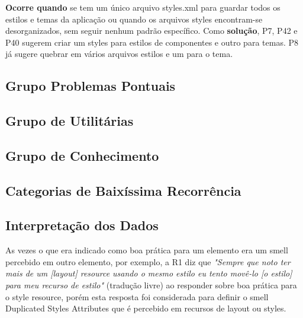 \textbf{Ocorre quando} se tem um \'unico arquivo styles.xml para guardar todos os estilos e temas da aplica\c{c}\~ao ou quando os arquivos styles encontram-se desorganizados, sem seguir nenhum padr\~ao espec\'ifico. Como \textbf{solu\c{c}\~ao}, P7, P42 e P40 sugerem criar um styles para estilos de componentes e outro para temas. P8 j\'a sugere quebrar em v\'arios arquivos estilos e um para o tema.



\subsection{Grupo Problemas Pontuais}

\subsection{Grupo de Utilit\'arias}

\subsection{Grupo de Conhecimento}

\subsection{Categorias de Baix\'issima Recorr\^encia}


\subsection{Interpreta\c{c}\~ao dos Dados}

As vezes o que era indicado como boa pr\'atica para um elemento era um smell percebido em outro elemento, por exemplo, a R1 diz que \textit{"Sempre que noto ter mais de um [layout] resource usando o mesmo estilo eu tento mov\^e-lo [o estilo] para meu recurso de estilo"} (tradu\c{c}\~ao livre) ao responder sobre boa pr\'atica para o style resource, por\'em esta resposta foi considerada para definir o smell Duplicated Styles Attributes que \'e percebido em recursos de layout ou styles.



